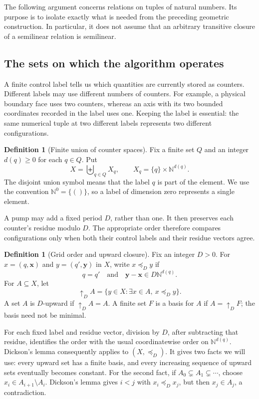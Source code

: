 \documentclass[11pt,a4paper]{article}
\theoremstyle{definition}
\newtheorem{definition}[theorem]{Definition}
\theoremstyle{remark}
\newcommand{\N}{\mathbb N}
\begin{document}
The following argument concerns relations on tuples of natural numbers.
Its purpose is to isolate exactly what is needed from the preceding
geometric construction. In particular, it does not assume that an
arbitrary transitive closure of a semilinear relation is semilinear.

\subsection{The sets on which the algorithm operates}

A finite control label tells us which quantities are currently stored
as counters. Different labels may use different numbers of counters.
For example, a physical boundary face uses two counters, whereas an
axis with its two bounded coordinates recorded in the label uses one.
Keeping the label is essential: the same numerical tuple at two
different labels represents two different configurations.

\begin{definition}[Finite union of counter spaces]
\label{def:counter-spaces}
Fix a finite set \(Q\) and an integer \(d(q)\geq0\) for each \(q\in Q\).
Put
\[
 X=\biguplus_{q\in Q} X_q,
 \qquad X_q=\{q\}\times\N^{d(q)}.
\]
The disjoint union symbol means that the label \(q\) is part of the
element. We use the convention \(\N^0=\{()\}\), so a label of dimension
zero represents a single element.
\end{definition}

A pump may add a fixed period \(D\), rather than one. It then preserves
each counter's residue modulo \(D\). The appropriate order therefore
compares configurations only when both their control labels and their
residue vectors agree.

\begin{definition}[Grid order and upward closure]
\label{def:grid-order}
Fix an integer \(D>0\). For \(x=(q,\boldsymbol x)\) and
\(y=(q',\boldsymbol y)\) in \(X\), write \(x\preceq_D y\) if
\[
 q=q'
 \quad\text{and}\quad
 \boldsymbol y-\boldsymbol x\in D\N^{d(q)}.
\]
For \(A\subseteq X\), let
\[
 \mathord{\uparrow_D}A
   =\{y\in X:\exists x\in A,\ x\preceq_D y\}.
\]
A set \(A\) is \(D\)-upward if
\(\mathord{\uparrow_D}A=A\). A finite set \(F\) is a basis for \(A\)
if \(A=\mathord{\uparrow_D}F\); the basis need not be minimal.
\end{definition}

For each fixed label and residue vector, division by \(D\), after
subtracting that residue, identifies the order with the usual
coordinatewise order on \(\N^{d(q)}\). Dickson's lemma consequently
applies to \((X,\preceq_D)\). It gives two facts we will use:
every upward set has a finite basis, and every increasing sequence of
upward sets eventually becomes constant. For the second fact, if
\(A_0\subsetneq A_1\subsetneq\cdots\), choose
\(x_i\in A_{i+1}\setminus A_i\). Dickson's lemma gives \(i<j\) with
\(x_i\preceq_D x_j\), but then \(x_j\in A_j\), a contradiction.
\end{document}
